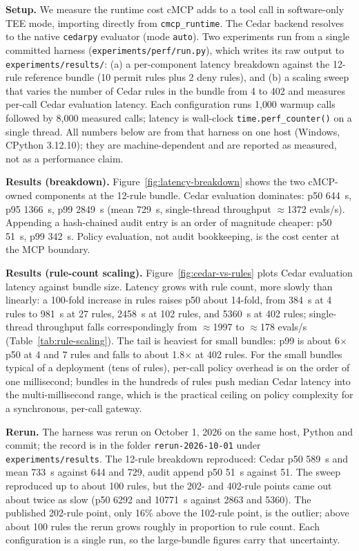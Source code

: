 \textbf{Setup.} We measure the runtime cost cMCP adds to a tool call in software-only TEE
mode, importing directly from \texttt{cmcp\_runtime}. The Cedar backend resolves to the
native \texttt{cedarpy} evaluator (mode \texttt{auto}). Two experiments run from a single
committed harness (\texttt{experiments/perf/run.py}), which writes its raw output to
\texttt{experiments/results/}: (a) a per-component latency breakdown against the 12-rule
reference bundle (10 permit rules plus 2 deny rules), and (b) a scaling sweep that varies
the number of Cedar rules in the bundle from 4 to 402 and measures per-call Cedar
evaluation latency. Each configuration runs 1{,}000 warmup calls followed by 8{,}000
measured calls; latency is wall-clock \texttt{time.perf\_counter()} on a single thread.
All numbers below are from that harness on one host (Windows, CPython 3.12.10); they are
machine-dependent and are reported as measured, not as a performance claim.

\textbf{Results (breakdown).} Figure~\ref{fig:latency-breakdown} shows the two cMCP-owned
components at the 12-rule bundle. Cedar evaluation dominates: p50 644~\textmu s, p95
1366~\textmu s, p99 2849~\textmu s (mean 729~\textmu s, single-thread throughput
$\approx$1372 evals/s). Appending a hash-chained audit entry is an order of magnitude
cheaper: p50 51~\textmu s, p99 342~\textmu s. Policy evaluation, not audit bookkeeping, is
the cost center at the MCP boundary.

\textbf{Results (rule-count scaling).} Figure~\ref{fig:cedar-vs-rules} plots Cedar
evaluation latency against bundle size. Latency grows with rule count, more slowly than
linearly: a 100-fold increase in rules raises p50 about 14-fold, from 384~\textmu s at 4
rules to 981~\textmu s at 27 rules, 2458~\textmu s at 102 rules, and 5360~\textmu s at 402
rules; single-thread throughput falls
correspondingly from $\approx$1997 to $\approx$178 evals/s (Table~\ref{tab:rule-scaling}).
The tail is heaviest for small bundles: p99 is about 6$\times$ p50 at 4 and 7 rules and
falls to about 1.8$\times$ at 402 rules. For the small bundles typical of a deployment (tens
of rules), per-call policy overhead is on the order of one millisecond; bundles in the
hundreds of rules push median Cedar latency into the multi-millisecond range, which is the
practical ceiling on policy complexity for a synchronous, per-call gateway.

\textbf{Rerun.} The harness was rerun on October 1, 2026 on the same host, Python and
commit; the record is in the folder \texttt{rerun-2026-10-01} under
\texttt{experiments/results}. The 12-rule breakdown reproduced:
Cedar p50 589~\textmu s and mean 733~\textmu s against 644 and 729, audit append p50
51~\textmu s against 51. The sweep reproduced up to about 100 rules, but the 202- and
402-rule points came out about twice as slow (p50 6292 and 10771~\textmu s against 2863
and 5360). The published 202-rule point, only 16\% above the 102-rule point, is the
outlier; above about 100 rules the rerun grows roughly in proportion to rule count. Each
configuration is a single run, so the large-bundle figures carry that uncertainty.

